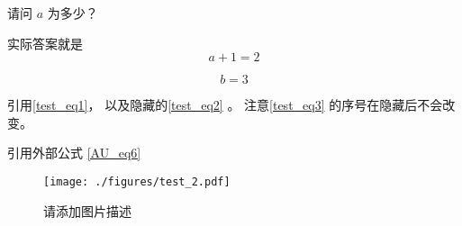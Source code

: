 \begin{example}{}
请问 $a$ 为多少？
\pay

实际答案就是
\begin{equation}\label{test_eq2}
a + 1 = 2
\end{equation}
\paid
\end{example}

\begin{equation}\label{test_eq3}
b = 3
\end{equation}


引用\autoref{test_eq1}， 以及隐藏的\autoref{test_eq2} 。 注意\autoref{test_eq3} 的序号在隐藏后不会改变。

引用外部公式 \autoref{AU_eq6}~
\begin{figure}[ht]
\centering
\texttt{[image: ./figures/test\_2.pdf]}
\caption{请添加图片描述} \label{test_fig2}
\end{figure}